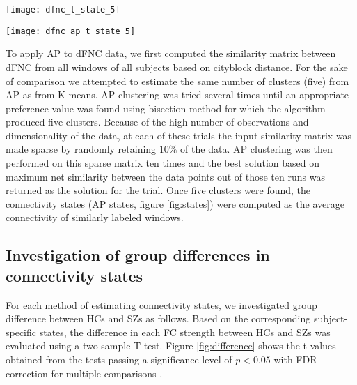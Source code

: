 \documentclass{article}
\begin{document}
\begin{figure*}
  \centering
  \centerline{\texttt{[image: dfnc\_t\_state\_5]}}
  \centerline{\texttt{[image: dfnc\_ap\_t\_state\_5]}}
  \caption{\ac{HC} vs \ac{SZ} group difference in \ac{DFC} connectivity states estimated by two separate clustering methods. 2-sample T-tests were performed on each connectivity mean strengths of \acp{HC} and \acp{SZ} to obtain group difference. t-values are shown for connectivity where $p<0.05$ (FDR corrected). \acp{HC} show significantly higher connectivity strength than \acp{SZ} where t-values are positive (red) and the opposite when it is negative (blue).}
  \label{fig:difference}
\end{figure*}

To apply \ac{AP} to \ac{dFNC} data, we first computed the similarity matrix between \ac{dFNC} from all windows of all subjects based on cityblock distance. For the sake of comparison we attempted to estimate the same number of clusters (five) from \ac{AP} as from K-means. \ac{AP} clustering was tried several times until an appropriate preference value was found using bisection method for which the algorithm produced five clusters. Because of the high number of observations and dimensionality of the data, at each of these trials the input similarity matrix was made sparse by randomly retaining $10\%$ of the data. \ac{AP} clustering was then performed on this sparse matrix ten times and the best solution based on maximum net similarity between the data points out of those ten runs was returned as the solution for the trial. Once five clusters were found, the connectivity states (\ac{AP} states, figure \ref{fig:states}) were computed as the average connectivity of similarly labeled windows.

\vfill\pagebreak

\subsection{Investigation of group differences in connectivity states}
\label{sec:GroupD}

For each method of estimating connectivity states, we investigated group difference between \acp{HC} and \acp{SZ} as follows. Based on the corresponding subject-specific states, the difference in each \ac{FC} strength between \acp{HC} and \acp{SZ} was evaluated using a two-sample T-test. Figure \ref{fig:difference} shows the t-values obtained from the tests passing a significance level of $p<0.05$ with \ac{FDR} correction for multiple comparisons \cite{benjamini_controlling_1995}. 
\end{document}
